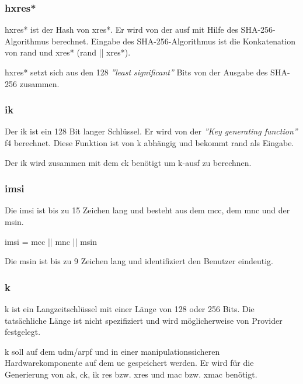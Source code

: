 \subsubsection{\gls{hxres*}}
\gls{hxres*} ist der Hash von \gls{xres*}.
Er wird von der \gls{ausf} mit Hilfe des SHA-256-Algorithmus berechnet. %
Eingabe des SHA-256-Algorithmus ist die Konkatenation von \gls{rand} und \gls{xres*} (\gls{rand} || \gls{xres*}).

\gls{hxres*} setzt sich aus den 128 \textit{''least significant''} Bits von der Ausgabe des SHA-256 zusammen.

\subsubsection{\gls{ik}}
Der \gls{ik} ist ein 128 Bit langer Schl\"ussel. %
Er wird von der \textit{''Key generating function''} f4 berechnet.
Diese Funktion ist von \gls{k} abh\"angig und bekommt \gls{rand} als Eingabe. %

Der \gls{ik} wird zusammen mit dem \gls{ck} ben\"otigt um \gls{k-ausf} zu berechnen.

\subsubsection{\gls{imsi}}
Die \gls{imsi} ist bis zu 15 Zeichen lang und besteht aus dem \gls{mcc}, dem \gls{mnc} und der \gls{msin}. %

\gls{imsi} = \gls{mcc} || \gls{mnc} || \gls{msin}

Die \gls{msin} ist bis zu 9 Zeichen lang und identifiziert den Benutzer eindeutig. %

\subsubsection{\gls{k}}
\gls{k} ist ein Langzeitschl\"ussel mit einer L\"ange von 128 oder 256 Bits. %
Die tats\"achliche L\"ange ist nicht spezifiziert und wird m\"oglicherweise von Provider festgelegt. %

\gls{k} soll auf dem \gls{udm}/\gls{arpf} und in einer manipulationssicheren Hardwarekomponente auf dem \gls{ue} gespeichert werden.  %
Er wird f\"ur die Generierung von \gls{ak}, \gls{ck}, \gls{ik} \gls{res} bzw. \gls{xres} und \gls{mac} bzw. \gls{xmac} ben\"otigt. 


